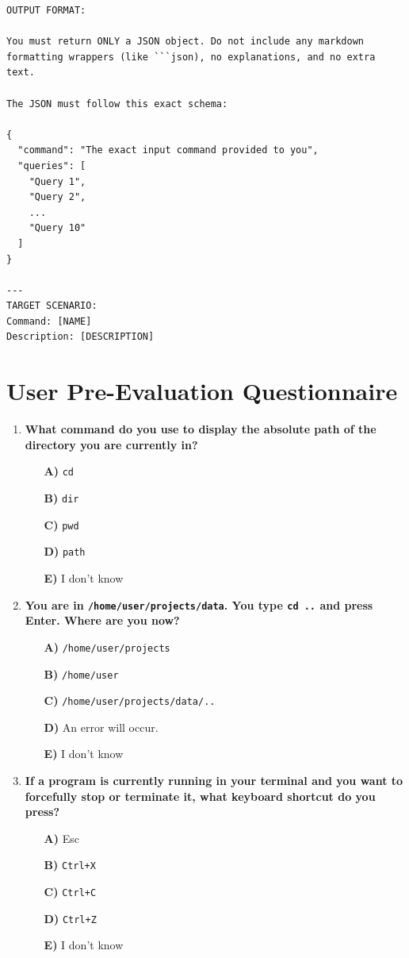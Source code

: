 \begin{appendix}
\begin{lstlisting}
OUTPUT FORMAT:

You must return ONLY a JSON object. Do not include any markdown formatting wrappers (like ```json), no explanations, and no extra text. 

The JSON must follow this exact schema:

{
  "command": "The exact input command provided to you",
  "queries": [
    "Query 1",
    "Query 2",
    ...
    "Query 10"
  ]
} 

---
TARGET SCENARIO:
Command: [NAME]
Description: [DESCRIPTION]
\end{lstlisting}



\section{User Pre-Evaluation Questionnaire}\label{app:pre-evaluation_questions}

\begin{enumerate}
    \item \textbf{What command do you use to display the absolute path of the directory you are currently in?}
    \begin{itemize}
        \item[\textbf{A)}] \texttt{cd}
        \item[\textbf{B)}] \texttt{dir}
        \item[\textbf{C)}] \texttt{pwd}
        \item[\textbf{D)}] \texttt{path}
        \item[\textbf{E)}] I don't know
    \end{itemize}

    \item \textbf{You are in \texttt{/home/user/projects/data}. You type \texttt{cd ..} and press Enter. Where are you now?}
    \begin{itemize}
        \item[\textbf{A)}] \texttt{/home/user/projects}
        \item[\textbf{B)}] \texttt{/home/user}
        \item[\textbf{C)}] \texttt{/home/user/projects/data/..}
        \item[\textbf{D)}] An error will occur.
        \item[\textbf{E)}] I don't know
    \end{itemize}

    \item \textbf{If a program is currently running in your terminal and you want to forcefully stop or terminate it, what keyboard shortcut do you press?}
    \begin{itemize}
        \item[\textbf{A)}] Esc
        \item[\textbf{B)}] \texttt{Ctrl+X}
        \item[\textbf{C)}] \texttt{Ctrl+C}
        \item[\textbf{D)}] \texttt{Ctrl+Z}
        \item[\textbf{E)}] I don't know
    \end{itemize}


\end{enumerate}
\end{appendix}
